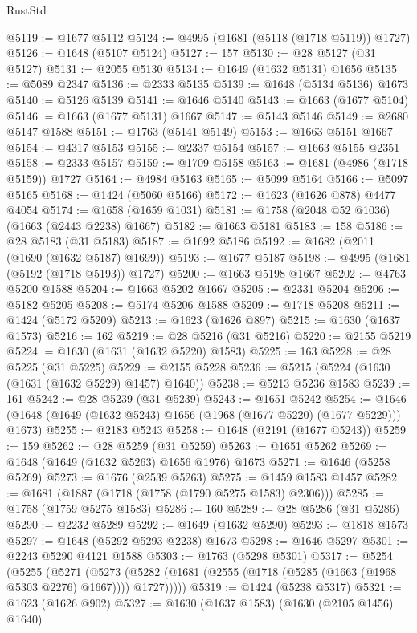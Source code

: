\begin{lexlean}{RustStd}
\begin{coremodule}
@5119 := @1677 @5112
@5124 := @4995 (@1681 (@5118 (@1718 @5119)) @1727)
@5126 := @1648 (@5107 @5124)
@5127 := 157
@5130 := @28 @5127 (@31 @5127)
@5131 := @2055 @5130
@5134 := @1649 (@1632 @5131) @1656
@5135 := @5089 @2347
@5136 := @2333 @5135
@5139 := @1648 (@5134 @5136) @1673
@5140 := @5126 @5139
@5141 := @1646 @5140
@5143 := @1663 (@1677 @5104)
@5146 := @1663 (@1677 @5131) @1667
@5147 := @5143 @5146
@5149 := @2680 @5147 @1588
@5151 := @1763 (@5141 @5149)
@5153 := @1663 @5151 @1667
@5154 := @4317 @5153
@5155 := @2337 @5154
@5157 := @1663 @5155 @2351
@5158 := @2333 @5157
@5159 := @1709 @5158
@5163 := @1681 (@4986 (@1718 @5159)) @1727
@5164 := @4984 @5163
@5165 := @5099 @5164
@5166 := @5097 @5165
@5168 := @1424 (@5060 @5166)
@5172 := @1623 (@1626 @878) @4477 @4054
@5174 := @1658 (@1659 @1031)
@5181 := @1758 (@2048 @52 @1036) (@1663 (@2443 @2238) @1667)
@5182 := @1663 @5181
@5183 := 158
@5186 := @28 @5183 (@31 @5183)
@5187 := @1692 @5186
@5192 := @1682 (@2011 (@1690 (@1632 @5187) @1699))
@5193 := @1677 @5187
@5198 := @4995 (@1681 (@5192 (@1718 @5193)) @1727)
@5200 := @1663 @5198 @1667
@5202 := @4763 @5200 @1588
@5204 := @1663 @5202 @1667
@5205 := @2331 @5204
@5206 := @5182 @5205
@5208 := @5174 @5206 @1588
@5209 := @1718 @5208
@5211 := @1424 (@5172 @5209)
@5213 := @1623 (@1626 @897)
@5215 := @1630 (@1637 @1573)
@5216 := 162
@5219 := @28 @5216 (@31 @5216)
@5220 := @2155 @5219
@5224 := @1630 (@1631 (@1632 @5220) @1583)
@5225 := 163
@5228 := @28 @5225 (@31 @5225)
@5229 := @2155 @5228
@5236 := @5215 (@5224 (@1630 (@1631 (@1632 @5229) @1457) @1640))
@5238 := @5213 @5236 @1583
@5239 := 161
@5242 := @28 @5239 (@31 @5239)
@5243 := @1651 @5242
@5254 := @1646 (@1648 (@1649 (@1632 @5243) @1656 (@1968 (@1677 @5220) (@1677 @5229))) @1673)
@5255 := @2183 @5243
@5258 := @1648 (@2191 (@1677 @5243))
@5259 := 159
@5262 := @28 @5259 (@31 @5259)
@5263 := @1651 @5262
@5269 := @1648 (@1649 (@1632 @5263) @1656 @1976) @1673
@5271 := @1646 (@5258 @5269)
@5273 := @1676 (@2539 @5263)
@5275 := @1459 @1583 @1457
@5282 := @1681 (@1887 (@1718 (@1758 (@1790 @5275 @1583) @2306)))
@5285 := @1758 (@1759 @5275 @1583)
@5286 := 160
@5289 := @28 @5286 (@31 @5286)
@5290 := @2232 @5289
@5292 := @1649 (@1632 @5290)
@5293 := @1818 @1573
@5297 := @1648 (@5292 @5293 @2238) @1673
@5298 := @1646 @5297
@5301 := @2243 @5290 @4121 @1588
@5303 := @1763 (@5298 @5301)
@5317 := @5254
    (@5255
      (@5271
        (@5273 (@5282 (@1681 (@2555 (@1718 (@5285 (@1663 (@1968 @5303 @2276) @1667)))) @1727)))))
@5319 := @1424 (@5238 @5317)
@5321 := @1623 (@1626 @902)
@5327 := @1630 (@1637 @1583) (@1630 (@2105 @1456) @1640)

\end{coremodule}
\end{lexlean}
